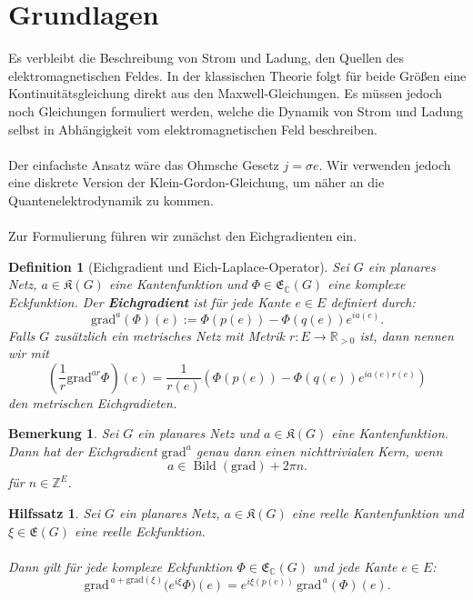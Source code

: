 \documentclass[11pt,a4paper,leqno]{report}
\newtheorem{lemma}[theorem]{Hilfssatz}
\newtheorem{definition}[theorem]{Definition}
\newtheorem{remark}[theorem]{Bemerkung}
\numberwithin{equation}{chapter}
\begin{document}
\section{Grundlagen}
Es verbleibt die Beschreibung von Strom und Ladung, den Quellen des elektromagnetischen Feldes. 
In der klassischen Theorie folgt für beide Größen eine Kontinuitätsgleichung direkt aus den 
Maxwell-Gleichungen. Es müssen jedoch noch Gleichungen formuliert werden, welche die Dynamik 
von Strom und Ladung selbst in Abhängigkeit vom elektromagnetischen Feld beschreiben.\\
\\
Der einfachste Ansatz wäre das Ohmsche Gesetz \(j = \sigma e\). Wir verwenden jedoch eine 
diskrete Version der Klein-Gordon-Gleichung, um näher an die Quantenelektrodynamik zu kommen. 
\\
\\
Zur Formulierung führen wir zunächst den Eichgradienten ein.
\begin{definition}[Eichgradient und Eich-Laplace-Operator]
	Sei \(G\) ein planares Netz, \(a \in \mathfrak{K}(G)\) eine Kantenfunktion und 
	\(\Phi \in \mathfrak{E}_\mathbb{C}(G)\) eine komplexe Eckfunktion. Der \textbf{Eichgradient} 
	ist für jede Kante \(e \in E\) definiert durch:
	\begin{equation}
		\mathrm{grad}^a(\Phi)(e) := \Phi(p(e)) - \Phi(q(e)) e^{i a(e)}.
	\end{equation}
	Falls \(G\) zusätzlich ein metrisches Netz mit Metrik \(r : E \to \mathbb{R}_{>0}\) ist, 
	dann nennen wir mit
	\begin{equation}
	(\frac{1}{r}\mathrm{grad}^{a r}\Phi)(e) = \frac{1}{r(e)}(\Phi(p(e)) - \Phi(q(e)) e^{i a(e)r(e)})
	\end{equation}
	den metrischen Eichgradieten.
\end{definition}
\begin{remark}\label{rem:Eichgradient-Kern}
	Sei \(G\) ein planares Netz und \(a \in \mathfrak{K}(G)\) eine Kantenfunktion. 
	Dann hat der Eichgradient \(\mathrm{grad}^{a}\) genau dann einen nichttrivialen Kern, 
	wenn
	\begin{equation}\label{eq:Eichgradient-Kernbedingung}
		a \in \operatorname{Bild}(\mathrm{grad})+2\pi n.
	\end{equation}
	für $n\in\mathbb{Z}^E$.
\end{remark}
\begin{lemma}\label{lem:eichgradient}
	Sei $G$ ein planares Netz, $a \in \mathfrak{K}(G)$ eine reelle Kantenfunktion und $\xi \in \mathfrak{E}(G)$ eine reelle Eckfunktion. \\
	\\
	Dann gilt für jede komplexe Eckfunktion $\Phi \in \mathfrak{E}_\mathbb{C}(G)$ und jede Kante $e \in E$:
	\begin{equation}
		\mathrm{grad}^{\,a + \mathrm{grad}(\xi)}\bigl(e^{i\xi}\Phi\bigr)(e)
		= e^{i\xi(p(e))}\, \mathrm{grad}^{\,a}(\Phi)(e).
	\end{equation}
\end{lemma}
\end{document}
